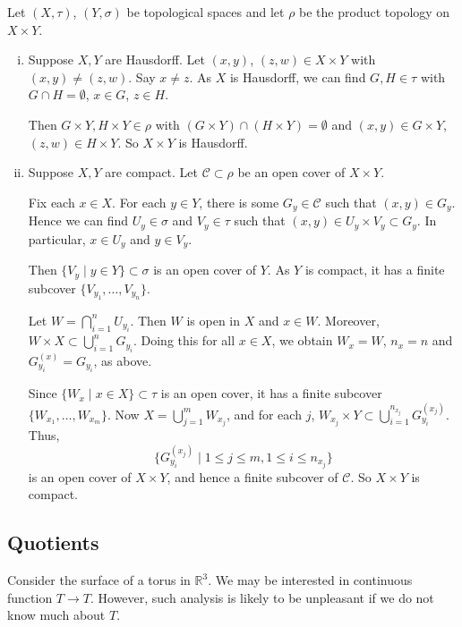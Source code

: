 \documentclass[12pt]{article}
\begin{document}
\begin{proofbox}
	Let $(X, \tau)$, $(Y, \sigma)$ be topological spaces and let $\rho$ be the product topology on $X \times Y$.

	\begin{enumerate}[(i)]
		\item Suppose $X, Y$ are Hausdorff. Let $(x, y)$, $(z, w) \in X \times Y$ with $(x, y) \neq (z, w)$. Say $x \neq z$. As $X$ is Hausdorff, we can find $G, H \in \tau$ with $G \cap H = \emptyset$, $x \in G$, $z \in H$.

			Then $G \times Y, H \times Y \in \rho$ with $(G \times Y) \cap (H \times Y) = \emptyset$ and $(x, y) \in G \times Y$, $(z, w) \in H \times Y$. So $X \times Y$ is Hausdorff.
		\item Suppose $X, Y$ are compact. Let $\mathcal{C} \subset \rho$ be an open cover of $X \times Y$.

			Fix each $x \in X$. For each $y \in Y$, there is some $G_y \in \mathcal{C}$ such that $(x, y) \in G_y$. Hence we can find $U_y \in \sigma$ and $V_y \in \tau$ such that $(x, y) \in U_y \times V_y \subset G_y$. In particular, $x \in U_y$ and $y \in V_y$.

			Then $\{V_y \mid y \in Y\} \subset \sigma$ is an open cover of $Y$. As $Y$ is compact, it has a finite subcover $\{V_{y_1}, \ldots, V_{y_n}\}$.

			Let $W = \bigcap_{i = 1}^{n} U_{y_i}$. Then $W$ is open in $X$ and $x \in W$. Moreover, $W \times X \subset \bigcup_{i = 1}^{n} G_{y_i}$. Doing this for all $x \in X$, we obtain $W_x = W$, $n_x = n$ and $G^{(x)}_{y_i} = G_{y_i}$, as above.

			Since $\{W_x \mid x \in X\} \subset \tau$ is an open cover, it has a finite subcover $\{W_{x_1}, \ldots, W_{x_m}\}$. Now $X = \bigcup_{j = 1}^{m} W_{x_j}$, and for each $j$, $W_{x_j} \times Y \subset \bigcup_{i = 1}^{n_{x_j}}G_{y_i}^{(x_j)}$. Thus,
			\[
				\{G_{y_i}^{(x_j)} \mid 1 \leq j \leq m, 1 \leq i \leq n_{x_j}\}
			\]
			is an open cover of $X \times Y$, and hence a finite subcover of $\mathcal{C}$. So $X \times Y$ is compact.
	\end{enumerate}
\end{proofbox}

\subsection{Quotients}%
\label{sub:quotients}

Consider the surface of a torus in $\mathbb{R}^3$. We may be interested in continuous function $T \to T$. However, such analysis is likely to be unpleasant if we do not know much about $T$.
\end{document}
